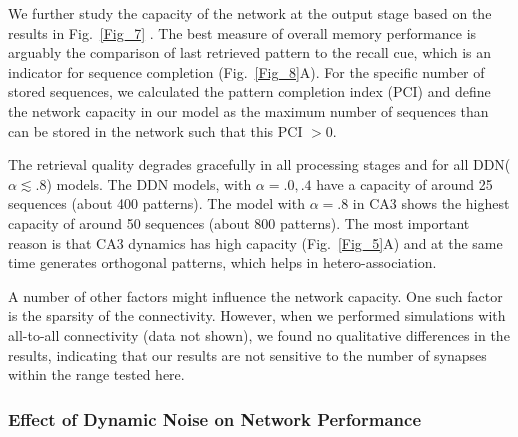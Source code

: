 \documentclass[utf8]{frontiersSCNS} %
\begin{document}
We further study the capacity of the network at the output stage based on the results in Fig.~\ref{Fig_7} . 
The best measure of overall memory performance is arguably the comparison of last retrieved pattern to the recall cue, which is an indicator for sequence completion (Fig.~\ref{Fig_8}A).
For the specific number of stored sequences, we calculated the pattern completion index (PCI) and define the network capacity in our model as the maximum number of sequences than can be stored in the network such that this PCI $> 0$.

The retrieval quality degrades gracefully in all processing stages and for all DDN($\alpha \lesssim .8$)  models. 
The DDN models, with $\alpha = .0, .4$ have a capacity of around 25 sequences (about 400 patterns). The model with $\alpha = .8$ in CA3 shows the highest capacity of around 50 sequences (about 800 patterns). The most important reason is that CA3 dynamics has high capacity (Fig.~\ref{Fig_5}A) and at the same time generates orthogonal patterns, which helps in hetero-association.  

A number of other factors might influence the network capacity. One such factor is the sparsity of the connectivity. However, when we performed simulations with all-to-all connectivity (data not shown), we found no qualitative differences in the results, indicating that our results are not sensitive to the number of synapses within the range tested here. 

\subsubsection{Effect of Dynamic Noise on Network Performance}
\end{document}
